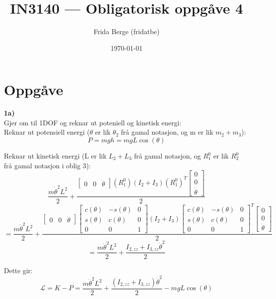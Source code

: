 \documentclass[12pt,norsk,a4paper]{article}
\author{Frida Berge (fridatbe)}
\title{IN3140 --- Obligatorisk oppgåve 4}
\date{\today}
\begin{document}
    \maketitle
    \renewcommand{\thesubsection}{(\alph{subsection})}



    \newpage
    \section{Oppgåve}
    \textbf{1a)}\\
    Gjer om til 1DOF og reknar ut poteniell og kinetisk energi:\\
    Reknar ut potensiell energi ($\theta$ er lik $\theta_2$ frå gamal notasjon, og m er lik $m_2+m_3$):
    \[P = mgh = mgL\cos(\theta)\]

    Reknar ut kinetisk energi (L er lik $L_2+L_3$ frå gamal notasjon, og $R_1^0$ er lik $R_2^0$ frå gamal notasjon i oblig 3):
    \[\frac{m\dot\theta^2L^2}{2}+\frac{\left[\begin{array}{ccc}0 & 0 & \dot\theta\end{array}\right](R_1^0)(I_2+I_3)(R_1^0)^T\left[\begin{array}{c}0 \\ 0 \\ \dot\theta\end{array}\right]}{2}\]
    \[=\frac{m\dot\theta^2L^2}{2}+\frac{\left[\begin{array}{ccc}0 & 0 & \dot\theta\end{array}\right]\left[\begin{array}{ccc}c(\theta) & -s(\theta) & 0 \\ s(\theta) & c(\theta) & 0 \\ 0 & 0 & 1\end{array}\right](I_2+I_3)\left[\begin{array}{ccc}c(\theta) & -s(\theta) & 0 \\ s(\theta) & c(\theta) & 0 \\ 0 & 0 & 1\end{array}\right]^T\left[\begin{array}{c}0 \\ 0 \\ \dot\theta\end{array}\right]}{2}\]
    \[=\frac{m\dot\theta^2L^2}{2}+ \frac{I_{2,zz}+I_{3,zz}\dot\theta^2}{2}\]

    Dette gir:
    \[\mathcal{L} = K-P = \frac{m\dot\theta^2L^2}{2}+ \frac{(I_{2,zz}+I_{3,zz})\dot\theta^2}{2} - mgL\cos(\theta)\]
\end{document}
